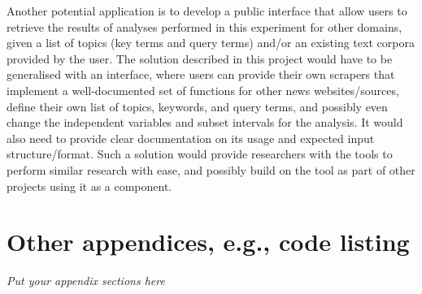 \documentclass{report}
\begin{document}
Another potential application is to develop a public interface that allow users to retrieve the results of analyses performed in this experiment for other domains, given a list of topics (key terms and query terms) and/or an existing text corpora provided by the user.
The solution described in this project would have to be generalised with an interface, where users can provide their own scrapers that implement a well-documented set of functions for other news websites/sources, define their own list of topics, keywords, and query terms, and possibly even change the independent variables and subset intervals for the analysis.
It would also need to provide clear documentation on its usage and expected input structure/format.
Such a solution would provide researchers with the tools to perform similar research with ease, and possibly build on the tool as part of other projects using it as a component.

\appendix

\printbibliography[heading=bibintoc]

\chapter{Other appendices, e.g., code listing}  %
\emph{Put your appendix sections here}

\end{document}
